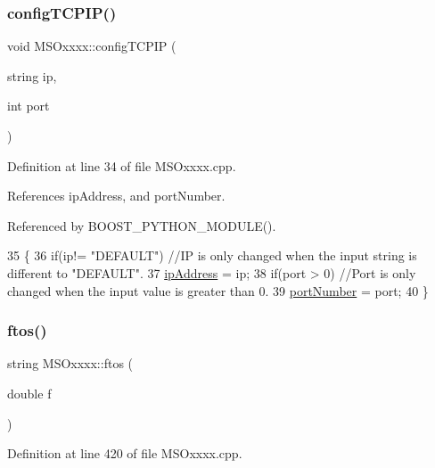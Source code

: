 \subsubsection{\texorpdfstring{config\+T\+C\+P\+I\+P()}{configTCPIP()}}
{\footnotesize\ttfamily void M\+S\+Oxxxx\+::config\+T\+C\+P\+IP (\begin{DoxyParamCaption}\item[{string}]{ip,  }\item[{int}]{port }\end{DoxyParamCaption})}



Definition at line 34 of file M\+S\+Oxxxx.\+cpp.



References ip\+Address, and port\+Number.



Referenced by B\+O\+O\+S\+T\+\_\+\+P\+Y\+T\+H\+O\+N\+\_\+\+M\+O\+D\+U\+L\+E().


\begin{DoxyCode}
35 \{
36     \textcolor{keywordflow}{if}(ip!= \textcolor{stringliteral}{"DEFAULT"})                                                              \textcolor{comment}{//IP is only changed
       when the input string is different to "DEFAULT".}
37         \hyperlink{classMSOxxxx_aa55bdb0feb799b195628fe6ef0222b62}{ipAddress} = ip;  
38     \textcolor{keywordflow}{if}(port > 0)                                                                            \textcolor{comment}{//Port is only
       changed when the input value is greater than 0.}
39         \hyperlink{classMSOxxxx_a242bcf72c701cd20d86d25315fc6180f}{portNumber} = port;
40 \}
\end{DoxyCode}
\mbox{\label{classMSOxxxx_ab9c897c3dc0a52cbe5a5da67fc520ed7}} 
\subsubsection{\texorpdfstring{ftos()}{ftos()}}
{\footnotesize\ttfamily string M\+S\+Oxxxx\+::ftos (\begin{DoxyParamCaption}\item[{double}]{f }\end{DoxyParamCaption})\hspace{0.3cm}{\ttfamily [private]}}



Definition at line 420 of file M\+S\+Oxxxx.\+cpp.



